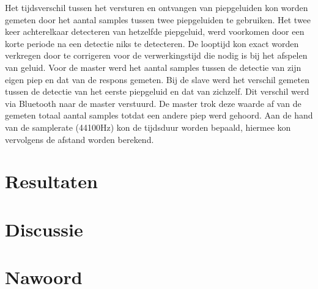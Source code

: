 \documentclass[12pt]{article}
\begin{document}
Het tijdsverschil tussen het versturen en ontvangen van piepgeluiden kon worden gemeten door het aantal samples tussen twee piepgeluiden te gebruiken. Het twee keer achterelkaar detecteren van hetzelfde piepgeluid, werd voorkomen door een korte periode na een detectie niks te detecteren. De looptijd kon exact worden verkregen door te corrigeren voor de verwerkingstijd die nodig is bij het afspelen van geluid. Voor de master werd het aantal samples tussen de detectie van zijn eigen piep en dat van de respons gemeten. Bij de slave werd het verschil gemeten tussen de detectie van het eerste piepgeluid en dat van zichzelf. Dit verschil werd via Bluetooth naar de master verstuurd. De master trok deze waarde af van de gemeten totaal aantal samples totdat een andere piep werd gehoord. Aan de hand van de samplerate (44100Hz) kon de tijdsduur worden bepaald, hiermee kon vervolgens de afstand worden berekend.

\section{Resultaten}


\section{Discussie}

\section{Nawoord}
\end{document}
